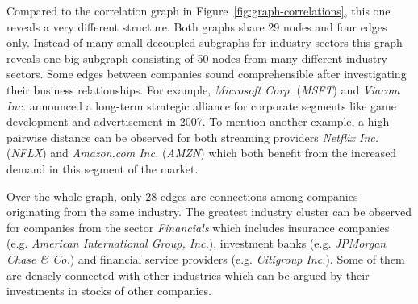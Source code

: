 Compared to the correlation graph in Figure~\ref{fig:graph-correlations}, this one reveals a very different structure. Both graphs share 29 nodes and four edges only. Instead of many small decoupled subgraphs for industry sectors this graph reveals one big subgraph consisting of 50 nodes from many different industry sectors. Some edges between companies sound comprehensible after investigating their business relationships. For example, \emph{Microsoft Corp.} (\emph{MSFT}) and \emph{Viacom Inc.} announced a long-term strategic alliance for corporate segments like game development and advertisement in 2007. To mention another example, a high pairwise distance can be observed for both streaming providers \emph{Netflix Inc.} (\emph{NFLX}) and \emph{Amazon.com Inc.} (\emph{AMZN}) which both benefit from the increased demand in this segment of the market.

Over the whole graph, only 28 edges are connections among companies originating from the same industry. The greatest industry cluster can be observed for companies from the sector \emph{Financials} which includes insurance companies (e.g. \emph{American International Group, Inc.}), investment banks (e.g. \emph{JPMorgan Chase \& Co.}) and financial service providers (e.g. \emph{Citigroup Inc.}). Some of them are densely connected with other industries which can be argued by their investments in stocks of other companies.







